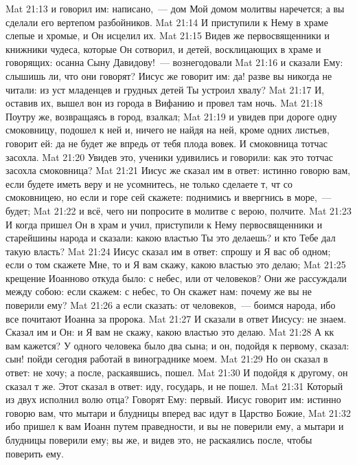 \vs Mat 21:13 и говорил им: написано,~--- дом Мой домом молитвы наречется; а вы сделали его вертепом разбойников.
\vs Mat 21:14 И приступили к Нему в храме слепые и хромые, и Он исцелил их.
\vs Mat 21:15 Видев же первосвященники и книжники чудеса, которые Он сотворил, и детей, восклицающих в храме и говорящих: осанна Сыну Давидову!~--- вознегодовали
\vs Mat 21:16 и сказали Ему: слышишь ли, что они говорят? Иисус же говорит им: да! разве вы никогда не читали: из уст младенцев и грудных детей Ты устроил хвалу?
\vs Mat 21:17 И, оставив их, вышел вон из города в Вифанию и провел там ночь.
\rsbpar\vs Mat 21:18 Поутру же, возвращаясь в город, взалкал;
\vs Mat 21:19 и увидев при дороге одну смоковницу, подошел к ней и, ничего не найдя на ней, кроме одних листьев, говорит ей: да не будет же впредь от тебя плода вовек. И смоковница тотчас засохла.
\vs Mat 21:20 Увидев это, ученики удивились и говорили: как это тотчас засохла смоковница?
\vs Mat 21:21 Иисус же сказал им в ответ: истинно говорю вам, если будете иметь веру и не усомнитесь, не только сделаете т, чт  со смоковницею, но если и горе сей скажете: поднимись и ввергнись в море,~--- будет;
\vs Mat 21:22 и всё, чего ни попросите в молитве с верою, полчите.
\rsbpar\vs Mat 21:23 И когда пришел Он в храм и учил, приступили к Нему первосвященники и старейшины народа и сказали: какою властью Ты это делаешь? и кто Тебе дал такую власть?
\vs Mat 21:24 Иисус сказал им в ответ: спрошу и Я вас об одном; если о том скажете Мне, то и Я вам скажу, какою властью это делаю;
\vs Mat 21:25 крещение Иоанново откуда было: с небес, или от человеков? Они же рассуждали между собою: если скажем: с небес, то Он скажет нам: почему же вы не поверили ему?
\vs Mat 21:26 а если сказать: от человеков,~--- боимся народа, ибо все почитают Иоанна за пророка.
\vs Mat 21:27 И сказали в ответ Иисусу: не знаем. Сказал им и Он: и Я вам не скажу, какою властью это делаю.
\rsbpar\vs Mat 21:28 А кк вам кажется? У одного человека было два сына; и он, подойдя к первому, сказал: сын! пойди сегодня работай в винограднике моем.
\vs Mat 21:29 Но он сказал в ответ: не хочу; а после, раскаявшись, пошел.
\vs Mat 21:30 И подойдя к другому, он сказал т же. Этот сказал в ответ: иду, государь, и не пошел.
\vs Mat 21:31 Который из двух исполнил волю отца? Говорят Ему: первый. Иисус говорит им: истинно говорю вам, что мытари и блудницы вперед вас идут в Царство Божие,
\vs Mat 21:32 ибо пришел к вам Иоанн путем праведности, и вы не поверили ему, а мытари и блудницы поверили ему; вы же, и видев это, не раскаялись после, чтобы поверить ему.

